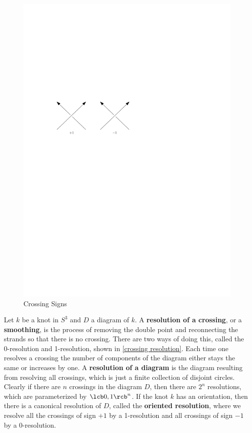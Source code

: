 \begin{figure}[tb]
\centering
\includegraphics[scale=1]{graphics/crossing-signs}
\caption{Crossing Signs}
\label{crossing signs}
\end{figure}

Let $k$ be a knot in $S^3$ and $D$ a diagram of $k$. A \textbf{resolution of a crossing}, or a \textbf{smoothing}, is the process of removing the double point and reconnecting the strands so that there is no crossing. There are two ways of doing this, called the 0-resolution and 1-resolution, shown in \cref{crossing resolution}. Each time one resolves a crossing the number of components of the diagram either stays the same or increases by one. A \textbf{resolution of a diagram} is the diagram resulting from resolving all crossings, which is just a finite collection of disjoint circles. Clearly if there are $n$ crossings in the diagram $D$, then there are $2^n$ resolutions, which are parameterized by $\lcb 0,1 \rcb^n$. If the knot $k$ has an orientation, then there is a canonical resolution of $D$, called the \textbf{oriented resolution}, where we resolve all the crossings of sign $+1$ by a 1-resolution and all crossings of sign $-1$ by a 0-resolution. 


